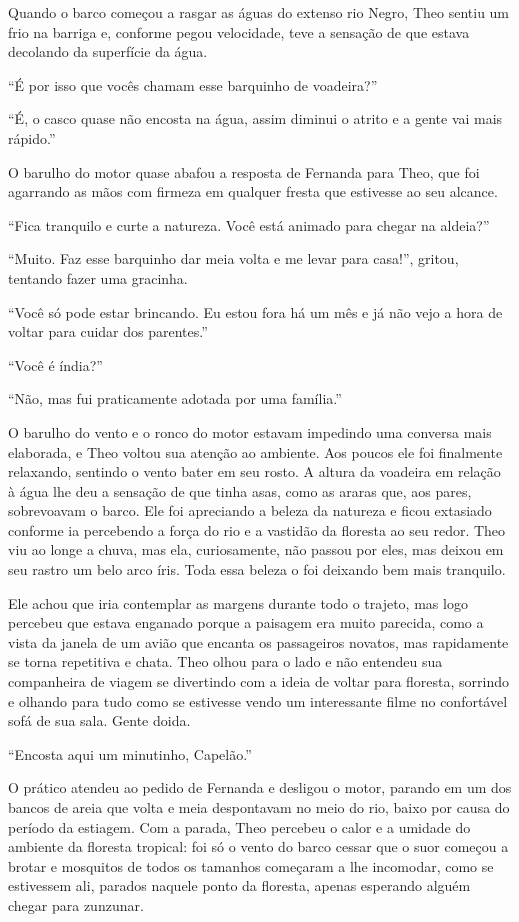 Quando o barco começou a rasgar as águas do extenso rio Negro, Theo
sentiu um frio na barriga e, conforme pegou velocidade, teve a sensação
de que estava decolando da superfície da água.

``É por isso que vocês chamam esse barquinho de voadeira?''

``É, o casco quase não encosta na água, assim diminui o atrito e a gente
vai mais rápido.''

O barulho do motor quase abafou a resposta de
Fernanda para Theo, que foi agarrando as mãos com firmeza em qualquer
fresta que estivesse ao seu alcance.

``Fica tranquilo e curte a natureza. Você está animado para chegar na
aldeia?''

``Muito. Faz esse barquinho dar meia volta e me levar para casa!'',
gritou, tentando fazer uma gracinha.

``Você só pode estar brincando. Eu estou fora há um mês e já não vejo a
hora de voltar para cuidar dos parentes.''

``Você é índia?''

``Não, mas fui praticamente adotada por uma família.''

O barulho do vento e o ronco do motor estavam impedindo uma
conversa mais elaborada, e Theo voltou sua atenção ao ambiente. Aos
poucos ele foi finalmente relaxando, sentindo o vento bater em seu
rosto. A altura da voadeira em relação à água lhe deu a sensação de que
tinha asas, como as araras que, aos pares, sobrevoavam o barco. Ele
foi apreciando a beleza da natureza e ficou extasiado conforme ia
percebendo a força do rio e a vastidão da floresta ao seu redor. Theo
viu ao longe a chuva, mas ela, curiosamente, não passou por eles, mas
deixou em seu rastro um belo arco íris. Toda essa beleza o foi
deixando bem mais tranquilo.

Ele achou que iria contemplar as margens durante todo o trajeto, mas
logo percebeu que estava enganado porque a paisagem era muito parecida,
como a vista da janela de um avião que encanta os passageiros novatos,
mas rapidamente se torna repetitiva e chata. Theo olhou para o lado e
não entendeu sua companheira de viagem se divertindo com a ideia de
voltar para floresta, sorrindo e olhando para tudo como se estivesse
vendo um interessante filme no confortável sofá de sua sala. Gente
doida.

``Encosta aqui um minutinho, Capelão.''

O prático atendeu ao pedido de
Fernanda e desligou o motor, parando em um dos bancos de areia que volta
e meia despontavam no meio do rio, baixo por causa do período da
estiagem. Com a parada, Theo percebeu o calor e a umidade do ambiente da
floresta tropical: foi só o vento do barco cessar que o suor começou a
brotar e mosquitos de todos os tamanhos começaram a lhe incomodar, como
se estivessem ali, parados naquele ponto da floresta, apenas esperando
alguém chegar para zunzunar.

